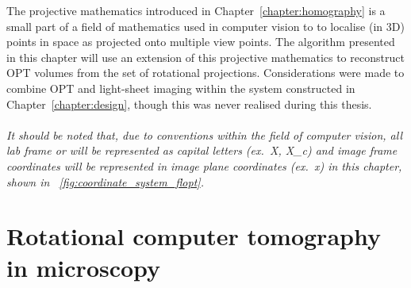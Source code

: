 The projective mathematics introduced in Chapter~\ref{chapter:homography} is a small part of a field of mathematics used in computer vision to to localise (in \gls{3D}) points in space as projected onto multiple view points.
The algorithm presented in this chapter will use an extension of this projective mathematics to reconstruct \gls{OPT} volumes from the set of rotational projections.
Considerations were made to combine \gls{OPT} and \gls{light-sheet} imaging within the system constructed in Chapter~\ref{chapter:design}, though this was never realised during this thesis.
\\\\
\emph{It should be noted that, due to conventions within the field of computer vision, all lab frame or  will be represented as capital letters (ex.~\gls{X}, \gls{X_c}) and image frame coordinates will be represented in image plane coordinates (ex.~\gls{x}) in this chapter, shown in \figurename~\ref{fig:coordinate_system_flopt}.}

\pagebreak

\section{Rotational computer tomography in microscopy}

